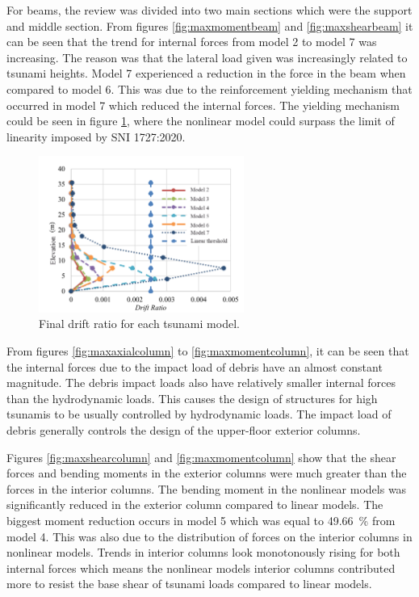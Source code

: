 \documentclass{cup-pan}
\begin{document}
For beams, the review was divided into two main sections which were the support and middle section. From figures \ref{fig:maxmomentbeam} and \ref{fig:maxshearbeam} it can be seen that the trend for internal forces from model 2 to model 7 was increasing. The reason was that the lateral load given was increasingly related to tsunami heights. Model 7 experienced a reduction in the force in the beam when compared to model 6. This was due to the reinforcement yielding mechanism that occurred in model 7 which reduced the internal forces. The yielding mechanism could be seen in figure \ref{fig:tsunamidrift}, where the nonlinear model could surpass the limit of linearity imposed by SNI 1727:2020.

\begin{figure}[H]
\centering
\includegraphics[width=0.6\textwidth]{Picture18_engels.png}
\caption{Final drift ratio for each tsunami model.}
\label{fig:tsunamidrift}
\end{figure}

From figures \ref{fig:maxaxialcolumn} to \ref{fig:maxmomentcolumn}, it can be seen that the internal forces due to the impact load of debris have an almost constant magnitude. The debris impact loads also have relatively smaller internal forces than the hydrodynamic loads. This causes the design of structures for high tsunamis to be usually controlled by hydrodynamic loads. The impact load of debris generally controls the design of the upper-floor exterior columns.

Figures \ref{fig:maxshearcolumn} and \ref{fig:maxmomentcolumn} show that the shear forces and bending moments in the exterior columns were much greater than the forces in the interior columns. The bending moment in the nonlinear models was significantly reduced in the exterior column compared to linear models. The biggest moment reduction occurs in model 5 which was equal to \SI{49.66}{\percent} from model 4. This was also due to the distribution of forces on the interior columns in nonlinear models. Trends in interior columns look monotonously rising for both internal forces which means the nonlinear models interior columns contributed more to resist the base shear of tsunami loads compared to linear models.
\end{document}
